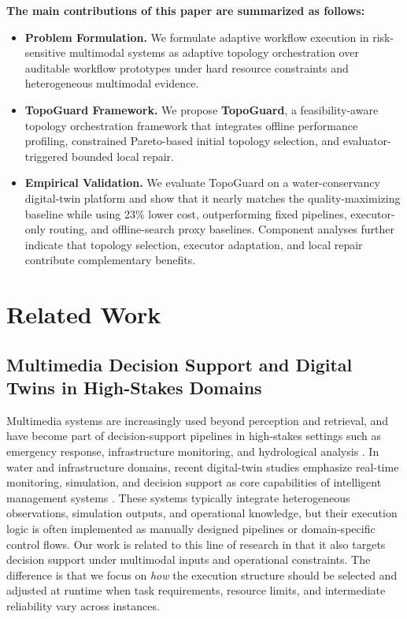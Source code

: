 \documentclass[manuscript,review,anonymous]{acmart}
\begin{document}
\noindent\textbf{The main contributions of this paper are summarized as follows:}
\begin{itemize}
    \item \textbf{Problem Formulation.} We formulate adaptive workflow execution in risk-sensitive multimodal systems as adaptive topology orchestration over auditable workflow prototypes under hard resource constraints and heterogeneous multimodal evidence.
    \item \textbf{TopoGuard Framework.} We propose \textbf{TopoGuard}, a feasibility-aware topology orchestration framework that integrates offline performance profiling, constrained Pareto-based initial topology selection, and evaluator-triggered bounded local repair.
    \item \textbf{Empirical Validation.} We evaluate TopoGuard on a water-conservancy digital-twin platform and show that it nearly matches the quality-maximizing baseline while using 23\% lower cost, outperforming fixed pipelines, executor-only routing, and offline-search proxy baselines. Component analyses further indicate that topology selection, executor adaptation, and local repair contribute complementary benefits.
\end{itemize}

\section{Related Work}
\label{sec:related_work}

\subsection{Multimedia Decision Support and Digital Twins in High-Stakes Domains}

Multimedia systems are increasingly used beyond perception and retrieval, and have become part of decision-support pipelines in high-stakes settings such as emergency response, infrastructure monitoring, and hydrological analysis \cite{tang2016emergency,pathak2020hydroinformatics,yu2024warenet}. In water and infrastructure domains, recent digital-twin studies emphasize real-time monitoring, simulation, and decision support as core capabilities of intelligent management systems \cite{li2024intelligentwater,ge2025urbanflooddt}. These systems typically integrate heterogeneous observations, simulation outputs, and operational knowledge, but their execution logic is often implemented as manually designed pipelines or domain-specific control flows. Our work is related to this line of research in that it also targets decision support under multimodal inputs and operational constraints. The difference is that we focus on \emph{how} the execution structure should be selected and adjusted at runtime when task requirements, resource limits, and intermediate reliability vary across instances.
\end{document}
